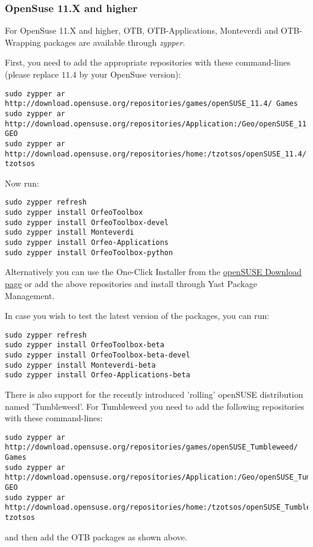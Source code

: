 \subsubsection{OpenSuse 11.X and higher}
\label{ssec:opensuse_binaries}

For OpenSuse 11.X and higher, OTB, OTB-Applications, Monteverdi and 
OTB-Wrapping packages are available through \emph{zypper}.

First, you need to add the appropriate repositories with these command-lines (please replace $11.4$ by your OpenSuse version):
\begin{verbatim}
sudo zypper ar 
http://download.opensuse.org/repositories/games/openSUSE_11.4/ Games
sudo zypper ar 
http://download.opensuse.org/repositories/Application:/Geo/openSUSE_11.4/ GEO
sudo zypper ar 
http://download.opensuse.org/repositories/home:/tzotsos/openSUSE_11.4/ tzotsos
\end{verbatim}

Now run:
\begin{verbatim}
sudo zypper refresh
sudo zypper install OrfeoToolbox
sudo zypper install OrfeoToolbox-devel
sudo zypper install Monteverdi
sudo zypper install Orfeo-Applications
sudo zypper install OrfeoToolbox-python
\end{verbatim}

Alternatively you can use the One-Click Installer from the \href{http://software.opensuse.org/search?q=Orfeo&baseproject=openSUSE\%3A11.4&lang=en&include_home=true&exclude_debug=true}{openSUSE Download page} or add the above repositories and install through Yast Package Management.

In case you wish to test the latest version of the packages, you can run:
\begin{verbatim}
sudo zypper refresh
sudo zypper install OrfeoToolbox-beta
sudo zypper install OrfeoToolbox-beta-devel
sudo zypper install Monteverdi-beta
sudo zypper install Orfeo-Applications-beta
\end{verbatim}

There is also support for the recently introduced 'rolling' openSUSE distribution named 'Tumbleweed'.
For Tumbleweed you need to add the following repositories with these command-lines:
\begin{verbatim}
sudo zypper ar 
http://download.opensuse.org/repositories/games/openSUSE_Tumbleweed/ Games
sudo zypper ar 
http://download.opensuse.org/repositories/Application:/Geo/openSUSE_Tumbleweed/ GEO
sudo zypper ar 
http://download.opensuse.org/repositories/home:/tzotsos/openSUSE_Tumbleweed/ tzotsos
\end{verbatim}
and then add the OTB packages as shown above.

